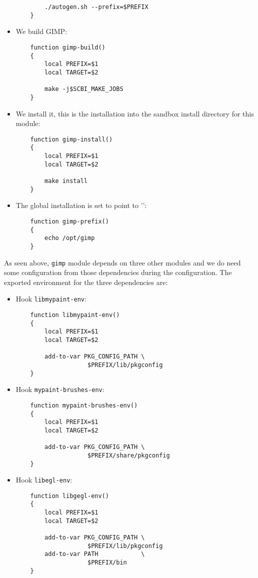 \documentclass[a4paper,12pt,twoside]{article}
\newcommand{\code}[1]{\texttt{#1}}
\newcommand{\file}[1]{'{\path{#1}}'}
\begin{document}
\begin{itemize}
\begin{lstlisting}
		./autogen.sh --prefix=$PREFIX
	}
	\end{lstlisting}

	\item We build GIMP:

	\begin{lstlisting}
	function gimp-build()
	{
		local PREFIX=$1
		local TARGET=$2

		make -j$SCBI_MAKE_JOBS
	}
	\end{lstlisting}

	\item We install it, this is the installation into the sandbox install directory for this module:

	\begin{lstlisting}
	function gimp-install()
	{
		local PREFIX=$1
		local TARGET=$2

		make install
	}
	\end{lstlisting}

	\item The global installation is set to point to \file{/opt/gimp}:

	\begin{lstlisting}
	function gimp-prefix()
	{
		echo /opt/gimp
	}
	\end{lstlisting}

\end{itemize}

As seen above, \code{gimp} module depends on three other modules and we do need some configuration from those dependencies during the configuration. The exported environment for the three dependencies are:

\begin{itemize}
	\item Hook \code{libmypaint-env}:

	\begin{lstlisting}
	function libmypaint-env()
	{
		local PREFIX=$1
		local TARGET=$2

		add-to-var PKG_CONFIG_PATH \
					$PREFIX/lib/pkgconfig
	}
	\end{lstlisting}

	\item Hook \code{mypaint-brushes-env}:

	\begin{lstlisting}
	function mypaint-brushes-env()
	{
		local PREFIX=$1
		local TARGET=$2

		add-to-var PKG_CONFIG_PATH \
					$PREFIX/share/pkgconfig
	}
	\end{lstlisting}

	\item Hook \code{libegl-env}:

	\begin{lstlisting}
	function libgegl-env()
	{
		local PREFIX=$1
		local TARGET=$2

		add-to-var PKG_CONFIG_PATH \
					$PREFIX/lib/pkgconfig
		add-to-var PATH            \
					$PREFIX/bin
	}
	\end{lstlisting}

\end{itemize}
\end{document}
